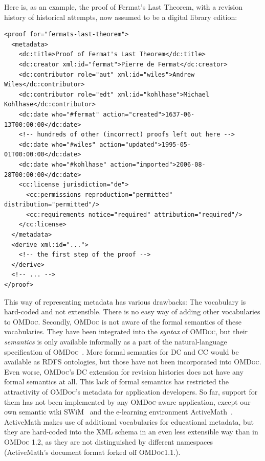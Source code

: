 \documentclass{llncs}
\renewcommand{\omdoc}{\textsc{OMDoc}\xspace}
\begin{document}
\ifpublic
\else
Here is, as an example, the proof of Fermat's Last Theorem, with a revision history of
historical attempts, now assumed to be a digital library edition:

\begin{lstlisting}
<proof for="fermats-last-theorem">
  <metadata>
    <dc:title>Proof of Fermat's Last Theorem</dc:title>
    <dc:creator xml:id="fermat">Pierre de Fermat</dc:creator>
    <dc:contributor role="aut" xml:id="wiles">Andrew Wiles</dc:contributor>
    <dc:contributor role="edt" xml:id="kohlhase">Michael Kohlhase</dc:contributor>
    <dc:date who="#fermat" action="created">1637-06-13T00:00:00</dc:date>
    <!-- hundreds of other (incorrect) proofs left out here -->
    <dc:date who="#wiles" action="updated">1995-05-01T00:00:00</dc:date>
    <dc:date who="#kohlhase" action="imported">2006-08-28T00:00:00</dc:date>
    <cc:license jurisdiction="de">
      <cc:permissions reproduction="permitted" distribution="permitted"/>
      <cc:requirements notice="required" attribution="required"/>
    </cc:license>
  </metadata>
  <derive xml:id="...">
    <!-- the first step of the proof -->
  </derive>
  <!-- ... -->
</proof>
\end{lstlisting}
\fi

\ifpublic{}\fi%
This way of representing metadata has various drawbacks: The vocabulary is hard-coded and
not extensible.  There is no easy way of adding other vocabularies to \omdoc.  Secondly,
\omdoc is not aware of the formal semantics of these vocabularies.  They have been
integrated into the \emph{syntax} of \omdoc, but their \emph{semantics} is only available
informally as a part of the natural-language specification of \omdoc~\cite[chap.\
12]{Kohlhase:omdoc1.2}.  More formal semantics for DC and CC would be available as RDFS
ontologies, but those have not been incorporated into \omdoc.  Even worse, \omdoc's DC
extension for revision histories does not have any formal semantics at all.  This lack of
formal semantics has restricted the attractivity of \omdoc's metadata for application
developers.  So far, support for them has not been implemented by any \omdoc-aware
application, except our own semantic wiki SWiM~\cite{lange:swim-demo08} and the e-learning
environment ActiveMath~\cite{LeAMD6}.  ActiveMath makes use of additional vocabularies for
educational metadata, but they are hard-coded into the XML schema in an even less
extensible way than in {\omdoc1.2}, as they are not distinguished by different
namespaces~\cite{LeAMD6} (ActiveMath's document format forked off {\omdoc}1.1.).
\end{document}
